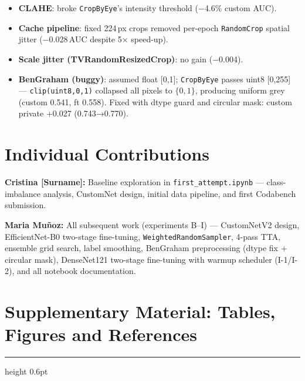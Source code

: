 \documentclass[a4paper, 10pt, twocolumn]{article}
\begin{document}
\begin{itemize}
  \item \textbf{CLAHE}: broke \texttt{CropByEye}'s intensity threshold
    ($-$4.6\% custom AUC).
  \item \textbf{Cache pipeline}: fixed 224\,px crops removed per-epoch
    \texttt{RandomCrop} spatial jitter ($-$0.028\,AUC despite 5$\times$ speed-up).
  \item \textbf{Scale jitter (TVRandomResizedCrop)}: no gain ($-$0.004).
  \item \textbf{BenGraham (buggy)}: assumed float [0,1]; \texttt{CropByEye}
    passes uint8 [0,255] — \texttt{clip(uint8,0,1)} collapsed all pixels to
    $\{0,1\}$, producing uniform grey (custom 0.541, ft 0.558). Fixed with
    dtype guard and circular mask: custom private +0.027 (0.743→0.770).
\end{itemize}

\section{Individual Contributions}

\textbf{Cristina [Surname]:} Baseline exploration in
\texttt{first\_attempt.ipynb} — class-imbalance analysis, CustomNet
design, initial data pipeline, and first Codabench submission.

\textbf{Maria Muñoz:} All subsequent work (experiments B–I) —
CustomNetV2 design, EfficientNet-B0 two-stage fine-tuning,
\texttt{Weighted\-Random\-Sampler}, 4-pass TTA, ensemble grid search,
label smoothing, BenGraham preprocessing (dtype fix + circular mask),
DenseNet121 two-stage fine-tuning with warmup scheduler (I-1/I-2), and
all notebook documentation.

\newpage
\onecolumn

\section*{\color{accent}Supplementary Material: Tables, Figures and References}
{\color{rulecolor}\hrule height 0.6pt}
\vspace{4pt}
\end{document}
